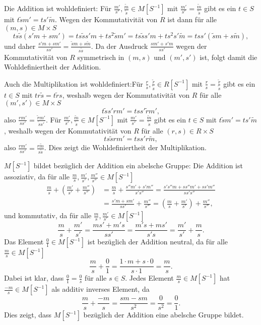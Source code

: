 \documentclass[a4paper,10pt]{article}
\theoremstyle{definition}
\begin{document}
Die Addition ist wohldefiniert: Für $\frac{m'}{s'}, \frac{\tilde{m}}{\tilde{s}} \in M[S^{-1}]$ mit $\frac{m'}{s'} = \frac{\tilde{m}}{\tilde{s}}$ gibt es ein $t \in S$ mit $t\tilde{s}m' = ts'\tilde{m}$. Wegen der Kommutativität von $R$ ist dann für alle $(m,s) \in M \times S$
\[
 ts\tilde{s}(s'm + sm')
 = ts\tilde{s}s'm + ts^2\tilde{s}m'
 = ts\tilde{s}s'm + ts^2s'\tilde{m}
 = tss'(\tilde{s}m+s\tilde{m}),
\]
und daher $\frac{s'm+sm'}{ss'} = \frac{\tilde{s}m+s\tilde{m}}{s\tilde{s}}$. Da der Ausdruck $\frac{sm'+s'm}{ss'}$ wegen der Kommutativität von $R$ symmetrisch in $(m,s)$ und $(m',s')$ ist, folgt damit die Wohldefiniertheit der Addition.

Auch die Multiplikation ist wohldefiniert:Für $\frac{r}{s},\frac{\tilde{r}}{\tilde{s}} \in R[S^{-1}]$ mit $\frac{r}{s} = \frac{\tilde{r}}{\tilde{s}}$ gibt es ein $t \in S$ mit $tr\tilde{s} = t\tilde{r}s$, weshalb wegen der Kommutativität von $R$ für alle $(m',s') \in M \times S$
\[
 t \tilde{s}s' rm' = t ss' \tilde{r}m',
\]
also $\frac{rm'}{ss'} = \frac{\tilde{r}m'}{\tilde{s}s'}$. Für $\frac{m'}{s'}, \frac{\tilde{m}}{\tilde{s}} \in M[S^{-1}]$ mit $\frac{m'}{s'} = \frac{\tilde{m}}{\tilde{s}}$ gibt es ein $t \in S$ mit $t\tilde{s}m' = ts'\tilde{m}$, weshalb wegen der Kommutativität von $R$ für alle $(r,s) \in R \times S$
\[
 t s\tilde{s} rm' = t ss' r\tilde{m},
\]
also $\frac{rm'}{ss'} = \frac{r\tilde{m}}{s\tilde{s}}$. Dies zeigt die Wohldefiniertheit der Multiplikation.

$M[S^{-1}]$ bildet bezüglich der Addition ein abelsche Gruppe: Die Addition ist assoziativ, da für alle $\frac{m}{s}, \frac{m'}{s'}, \frac{m''}{s''} \in M[S^{-1}]$
\begin{align*}
 \frac{m}{s} + \left( \frac{m'}{s'} + \frac{m''}{s''} \right)
 &= \frac{m}{s} + \frac{s''m' + s'm''}{s's''}
 = \frac{s's''m + ss''m' + ss'm''}{ss's''} \\
 &= \frac{s'm + sm'}{ss'} + \frac{m''}{s''}
 = \left( \frac{m}{s} + \frac{m'}{s'} \right) + \frac{m''}{s''},
\end{align*}
und kommutativ, da für alle $\frac{m}{s}, \frac{m'}{s'} \in M[S^{-1}]$
\[
 \frac{m}{s} + \frac{m'}{s'}
 = \frac{ms' + m's}{ss'}
 = \frac{m's + ms'}{s's}
 = \frac{m'}{s'} + \frac{m}{s}.
\]
Das Element $\frac{0}{1} \in M[S^{-1}]$ ist bezüglich der Addition neutral, da für alle $\frac{m}{s} \in M[S^{-1}]$
\[
 \frac{m}{s} + \frac{0}{1} = \frac{1 \cdot m + s \cdot 0}{s \cdot 1} = \frac{m}{s}.
\]
Dabei ist klar, dass $\frac{0}{1} = \frac{0}{s}$ für alle $s \in S$. Jedes Element $\frac{m}{s} \in M[S^{-1}]$ hat $\frac{-m}{s} \in M[S^{-1}]$ als additiv inverses Element, da
\[
 \frac{m}{s} + \frac{-m}{s} = \frac{sm - sm}{s^2} = \frac{0}{s^2} = \frac{0}{1}.
\]
Dies zeigt, dass $M[S^{-1}]$ bezüglich der Addition eine abelsche Gruppe bildet.
\end{document}
